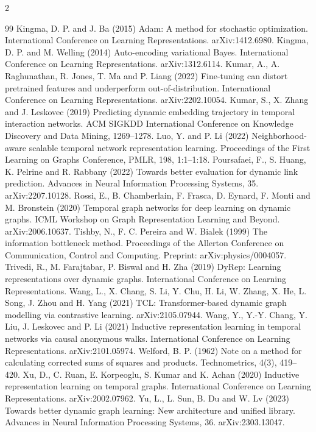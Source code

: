 \documentclass[a4paper,10pt]{article}
\begin{document}
\begin{multicols}{2}
\begin{thebibliography}{99}
 Kingma, D. P. and J. Ba (2015) Adam: A method for stochastic optimization. International Conference on Learning Representations. arXiv:1412.6980.
 Kingma, D. P. and M. Welling (2014) Auto-encoding variational Bayes. International Conference on Learning Representations. arXiv:1312.6114.
 Kumar, A., A. Raghunathan, R. Jones, T. Ma and P. Liang (2022) Fine-tuning can distort pretrained features and underperform out-of-distribution. International Conference on Learning Representations. arXiv:2202.10054.
 Kumar, S., X. Zhang and J. Leskovec (2019) Predicting dynamic embedding trajectory in temporal interaction networks. ACM SIGKDD International Conference on Knowledge Discovery and Data Mining, 1269--1278.
 Luo, Y. and P. Li (2022) Neighborhood-aware scalable temporal network representation learning. Proceedings of the First Learning on Graphs Conference, PMLR, 198, 1:1--1:18.
 Poursafaei, F., S. Huang, K. Pelrine and R. Rabbany (2022) Towards better evaluation for dynamic link prediction. Advances in Neural Information Processing Systems, 35. arXiv:2207.10128.
 Rossi, E., B. Chamberlain, F. Frasca, D. Eynard, F. Monti and M. Bronstein (2020) Temporal graph networks for deep learning on dynamic graphs. ICML Workshop on Graph Representation Learning and Beyond. arXiv:2006.10637.
 Tishby, N., F. C. Pereira and W. Bialek (1999) The information bottleneck method. Proceedings of the Allerton Conference on Communication, Control and Computing. Preprint: arXiv:physics/0004057.
 Trivedi, R., M. Farajtabar, P. Biswal and H. Zha (2019) DyRep: Learning representations over dynamic graphs. International Conference on Learning Representations.
 Wang, L., X. Chang, S. Li, Y. Chu, H. Li, W. Zhang, X. He, L. Song, J. Zhou and H. Yang (2021) TCL: Transformer-based dynamic graph modelling via contrastive learning. arXiv:2105.07944.
 Wang, Y., Y.-Y. Chang, Y. Liu, J. Leskovec and P. Li (2021) Inductive representation learning in temporal networks via causal anonymous walks. International Conference on Learning Representations. arXiv:2101.05974.
 Welford, B. P. (1962) Note on a method for calculating corrected sums of squares and products. Technometrics, 4(3), 419--420.
 Xu, D., C. Ruan, E. Korpeoglu, S. Kumar and K. Achan (2020) Inductive representation learning on temporal graphs. International Conference on Learning Representations. arXiv:2002.07962.
 Yu, L., L. Sun, B. Du and W. Lv (2023) Towards better dynamic graph learning: New architecture and unified library. Advances in Neural Information Processing Systems, 36. arXiv:2303.13047.
\end{thebibliography}
\endgroup
\end{multicols}
\end{document}

